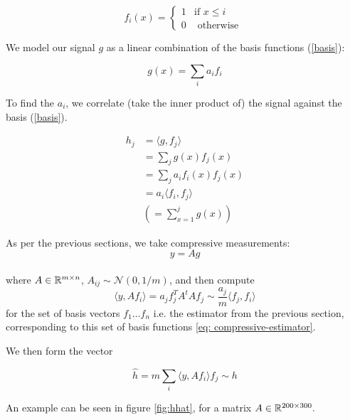 \begin{equation}
f_i\left(x\right) =
\begin{cases}
1 & \text{if } x \leq i \\
0 & \text{ otherwise } 
\end{cases}
\label{basis}
\end{equation}

We model our signal \(g\) as a linear combination of the basis functions (\ref{basis}):

\begin{equation}
g\left(x\right) = \sum_i a_i f_i 
\label{basis-expansion}
\end{equation}

To find the \(a_i\), we correlate (take the inner product of) the signal against the basis (\ref{basis}).

\begin{definition}
\begin{align}
h_j &= \langle g, f_j \rangle \\
&= \sum_j g\left(x\right) f_j\left(x\right) \\
&= \sum_j a_i f_i\left(x\right) f_j\left(x\right) \\
&= a_i \langle f_i, f_j\rangle \\
&\left(= \sum_{x=1}^j g\left(x\right)\right)
\end{align}
\end{definition}

As per the previous sections, we take compressive measurements:
\begin{equation}
y = Ag
\end{equation}
\\
where \(A \in {\mathbb{R}}^{m \times n} \), \(A_{ij} \sim \mathcal{N}\left(0,1/m\right)\), and then compute 
\begin{equation}
\langle y, Af_i\rangle = a_j  f_j^TA^tAf_j \sim \frac{a_j}{m} \langle f_j, f_i \rangle
\end{equation}
for the set of basis vectors \(f_1 \ldots f_n\) i.e. the estimator from the previous section, corresponding to this set of basis functions \eqref{eq: compressive-estimator}. 

We then form the vector 

\begin{equation}
\hat{h} = m \sum_i \langle y, Af_i\rangle f_j \sim h
\label{ss-estimator}
\end{equation}

An example can be seen in figure \ref{fig:hhat}, for a matrix \(A \in {\mathbb{R}}^{200 \times 300}.\)

